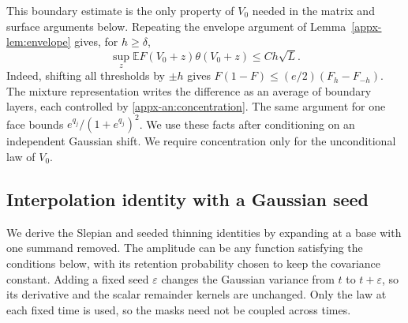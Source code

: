\documentclass[11pt,letterpaper]{article}
\theoremstyle{remark}
\newcommand{\E}{\mathbb E}
\begin{document}
This boundary estimate is the only property of \(V_0\) needed in the
matrix and surface arguments below. Repeating the envelope argument of
Lemma~\ref{appx-lem:envelope} gives, for \(h\ge\delta\),
\begin{equation}
 \sup_z\E F(V_0+z)\theta(V_0+z)\le Ch\sqrt L.
 \label{appx-an:weight-concentration}
\end{equation}
Indeed, shifting all thresholds by \(\pm h\) gives
\(F(1-F)\le(e/2)(F_h-F_{-h})\). The mixture representation writes
the difference as an average of boundary layers, each controlled by
\eqref{appx-an:concentration}. The same argument for one face bounds
\(e^{q_j}/(1+e^{q_j})^2\). We use these facts after conditioning on
an independent Gaussian shift. We require concentration only for the
unconditional law of \(V_0\).

\subsection{Interpolation identity with a Gaussian seed}
\label{appx-an:sec:path}

We derive the Slepian and seeded thinning identities by expanding at
a base with one summand removed. The amplitude can be any function
satisfying the conditions below, with its retention probability chosen
to keep the covariance constant. Adding a fixed seed \(\varepsilon\)
changes the Gaussian variance from \(t\) to \(t+\varepsilon\),
so its derivative and the scalar remainder kernels are unchanged.
Only the law at each fixed time is used, so the masks need not be
coupled across times.
\end{document}
